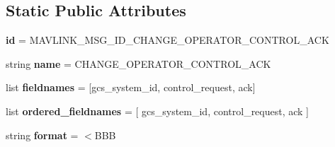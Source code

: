 \subsection*{Static Public Attributes}
\begin{DoxyCompactItemize}
\item 
\mbox{\label{classpymavlink_1_1dialects_1_1v10_1_1MAVLink__change__operator__control__ack__message_a2090a1af0c0ec2f796427b045c696b26}} 
{\bfseries id} = M\+A\+V\+L\+I\+N\+K\+\_\+\+M\+S\+G\+\_\+\+I\+D\+\_\+\+C\+H\+A\+N\+G\+E\+\_\+\+O\+P\+E\+R\+A\+T\+O\+R\+\_\+\+C\+O\+N\+T\+R\+O\+L\+\_\+\+A\+CK
\item 
\mbox{\label{classpymavlink_1_1dialects_1_1v10_1_1MAVLink__change__operator__control__ack__message_a28e17bba65062d3b97e1c226935db91b}} 
string {\bfseries name} = \textquotesingle{}C\+H\+A\+N\+G\+E\+\_\+\+O\+P\+E\+R\+A\+T\+O\+R\+\_\+\+C\+O\+N\+T\+R\+O\+L\+\_\+\+A\+CK\textquotesingle{}
\item 
\mbox{\label{classpymavlink_1_1dialects_1_1v10_1_1MAVLink__change__operator__control__ack__message_a63d7de8707f8bc71c8455ecfd677bd21}} 
list {\bfseries fieldnames} = \mbox{[}\textquotesingle{}gcs\+\_\+system\+\_\+id\textquotesingle{}, \textquotesingle{}control\+\_\+request\textquotesingle{}, \textquotesingle{}ack\textquotesingle{}\mbox{]}
\item 
\mbox{\label{classpymavlink_1_1dialects_1_1v10_1_1MAVLink__change__operator__control__ack__message_a3255c112933be1805c05e5367c5df3a3}} 
list {\bfseries ordered\+\_\+fieldnames} = \mbox{[} \textquotesingle{}gcs\+\_\+system\+\_\+id\textquotesingle{}, \textquotesingle{}control\+\_\+request\textquotesingle{}, \textquotesingle{}ack\textquotesingle{} \mbox{]}
\item 
\mbox{\label{classpymavlink_1_1dialects_1_1v10_1_1MAVLink__change__operator__control__ack__message_a7a9637f132e5f5d16df00d3bdce125fc}} 
string {\bfseries format} = \textquotesingle{}$<$B\+BB\textquotesingle{}

\end{DoxyCompactItemize}
